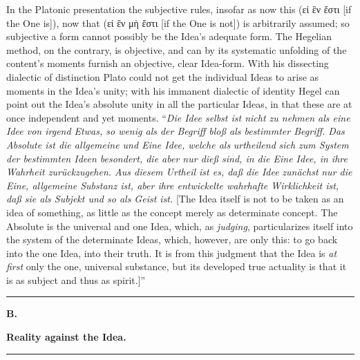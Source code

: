 \documentclass[12pt]{book}
\begin{document}
In the Platonic presentation the subjective rules, insofar as now this (εἰ ἓν ἔστι [if the One is]),
now that (εἰ ἓν μὴ ἔστι [if the One is not]) is arbitrarily assumed; so subjective a form cannot
possibly be the Idea's adequate form. The Hegelian method, on the contrary, is objective, and can by
its systematic unfolding of the
content's moments furnish an objective, clear Idea-form. With his dissecting dialectic of distinction
Plato could not get the individual Ideas to arise as moments in the Idea's unity; with his immanent
dialectic of identity Hegel can point out the Idea's absolute unity in all the particular Ideas, in
that these are at once independent and yet moments.
``\textit{Die Idee selbst ist nicht zu nehmen als eine Idee von irgend Etwas, so wenig als der Begriff
bloß als bestimmter Begriff. Das Absolute ist die allgemeine und Eine Idee, welche als} \emph{urtheilend}
\textit{sich zum System der bestimmten Ideen besondert, die aber nur dieß sind, in die Eine Idee, in ihre
Wahrheit zurückzugehen. Aus diesem Urtheil ist es, daß die Idee} \emph{zunächst} \textit{nur die Eine,
allgemeine Substanz ist, aber ihre entwickelte wahrhafte Wirklichkeit ist, daß sie als Subjekt und so
als Geist ist.} [The Idea itself is not to be taken as an idea of something, as little as the concept
merely as determinate concept. The Absolute is the universal and one Idea, which, as \emph{judging},
particularizes itself into the system of the determinate Ideas, which, however, are only this: to go
back into the one Idea, into their truth. It is from this judgment that the Idea is \emph{at first} only
the one, universal substance, but its developed true actuality is that it is as subject and thus as
spirit.]''

\begin{center}\rule{0.35\linewidth}{0.4pt}\end{center}

\begin{center}
  {\large\bfseries B.}\par\vspace{2pt}
  {\bfseries Reality against the Idea.}\par\vspace{4pt}
  \rule{2cm}{0.4pt}
\end{center}
{}
\end{document}

